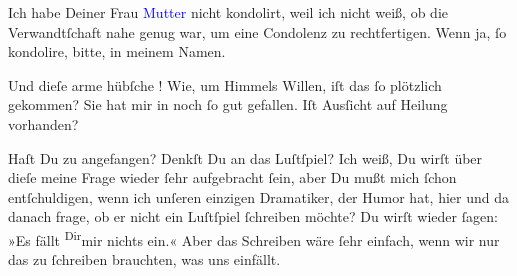 \pstart
           Ich habe Deiner Frau \textcolor{blue}{Mutter}{}\ledrightnote{{$\rightarrow$}\textcolor{blue}{Louise Schnitzler}}
               nicht kondolirt, weil ich nicht weiß, ob die Verwandtſchaft nahe genug war, um eine
               Condolenz zu rechtfertigen. Wenn ja, ſo {\pb}kondolire,
               bitte, in meinem Namen.\pend
           
\pstart
           Und dieſe arme hübſche \label{K_L03204-7v}\label{K_L03204-7h}! Wie, um Himmels Willen, iſt das ſo plötzlich
               gekommen? Sie hat mir in \label{K_L03204-8v}\label{K_L03204-8h} noch ſo gut gefallen. Iſt Ausſicht auf Heilung vorhanden?\pend
           
\pstart
           Haſt Du zu \label{K_L03204-9v}\label{K_L03204-9h}
               angefangen? Denkſt Du an das Luſtſpiel? Ich weiß, Du wirſt über dieſe meine Frage
               wieder ſehr aufgebracht ſein, aber Du mußt mich ſchon entſchuldigen, wenn ich unſeren
               einzigen  Dramatiker, der \strikeout{\textcolor{gray}{h}\textcolor{gray}{×}\-\textcolor{gray}{×}\-\textcolor{gray}{×}\-\textcolor{gray}{×}\-\textcolor{gray}{×}} Humor hat, hier und da danach frage, {\pb}ob er
               nicht ein Luſtſpiel ſchreiben möchte? Du wirſt wieder ſagen: »Es fällt \substVorne{}\textsuperscript{Dir}\substDazwischen{}mir\substHinten{} nichts ein.«  Aber das  Schreiben wäre ſehr einfach, wenn wir nur das
               zu ſchreiben brauchten, was uns 
               einfällt.\pend
           
